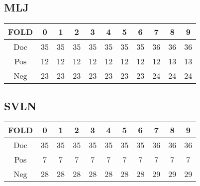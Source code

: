 \subsection{MLJ}
\begin{table}[htbp]
	\centering
		\begin{tabular}{c | cccccccccc}
			FOLD &  0 &  1 &  2 &  3 &  4 &  5 &  6 &  7 &  8 &  9 \\ \hline
			Doc  & 35 & 35 & 35 & 35 & 35 & 35 & 35 & 36 & 36 & 36 \\
			Pos  & 12  & 12  &  12 &  12 &  12 &  12 &  12 &  12 &  13 &  13 \\
			Neg  & 23 & 23 & 23 & 23 & 23 & 23 & 23 & 24 & 24 & 24 \\
		\end{tabular}%
	
	\label{tab:MLJ}
\end{table}
\subsection{SVLN}
\begin{table}[htbp]
	\centering
		\begin{tabular}{c|cccccccccc}
			FOLD & 0 &  1 &  2 &  3 &  4 &  5 &  6 &  7 &  8 &  9 \\\hline
			Doc  & 35 & 35 & 35 & 35 & 35 & 35 & 35 & 36 & 36 & 36 \\
			Pos  & 7  & 7  &  7 &  7 &  7 &  7 &  7 &  7 &  7 &  7 \\
			Neg  & 28 & 28 & 28 & 28 & 28 & 28 & 28 & 29 & 29 & 29 \\
		\end{tabular}%
	\label{tab:SVLN}
\end{table}
